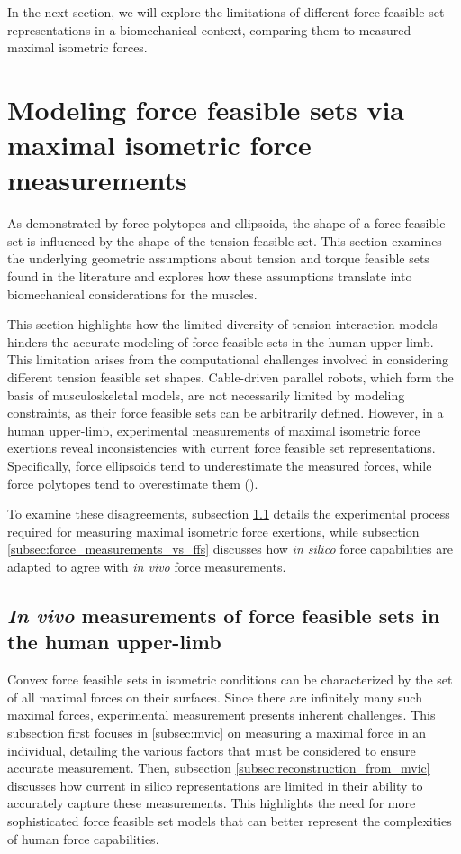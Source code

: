 In the next section, we will explore the limitations of different force feasible set representations in a biomechanical context, comparing them to measured maximal isometric forces.

\section{Modeling force feasible sets via maximal isometric force measurements}
\label{sec:modeling_muscle_tensions}

As demonstrated by force polytopes and ellipsoids, the shape of a force feasible set is influenced by the shape of the tension feasible set. This section examines the underlying geometric assumptions about tension and torque feasible sets found in the literature and explores how these assumptions translate into biomechanical considerations for the muscles.

This section highlights how the limited diversity of tension interaction models hinders the accurate modeling of force feasible sets in the human upper limb. This limitation arises from the computational challenges involved in considering different tension feasible set shapes. Cable-driven parallel robots, which form the basis of musculoskeletal models, are not necessarily limited by modeling constraints, as their force feasible sets can be arbitrarily defined. However, in a human upper-limb, experimental measurements of maximal isometric force exertions reveal inconsistencies with current force feasible set representations. Specifically, force ellipsoids tend to underestimate the measured forces, while force polytopes tend to overestimate them (\cite{rezzougUpperLimbIsometricForce2021b}).

To examine these disagreements, subsection \ref{subsec:ffs_in_human_upper_limb} details the experimental process required for measuring maximal isometric force exertions, while subsection \ref{subsec:force_measurements_vs_ffs} discusses how \emph{in silico} force capabilities are adapted to agree with \emph{in vivo} force measurements.

\subsection{\emph{In vivo} measurements of force feasible sets in the human upper-limb}
\label{subsec:ffs_in_human_upper_limb}
Convex force feasible sets in isometric conditions can be characterized by the set of all maximal forces on their surfaces. Since there are infinitely many such maximal forces, experimental measurement presents inherent challenges. This subsection first focuses in \ref{subsec:mvic} on measuring a maximal force in an individual, detailing the various factors that must be considered to ensure accurate measurement. Then, subsection \ref{subsec:reconstruction_from_mvic} discusses how current in silico representations are limited in their ability to accurately capture these measurements. This highlights the need for more sophisticated force feasible set models that can better represent the complexities of human force capabilities.

